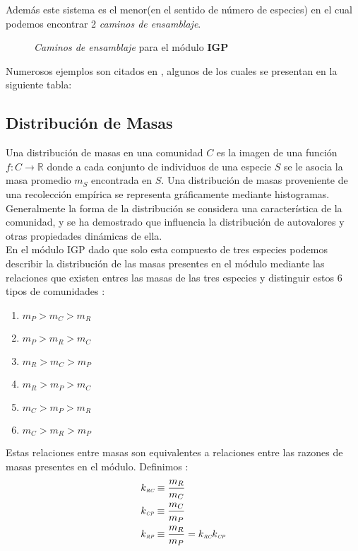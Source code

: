 Adem\'as este sistema es el menor(en el sentido de n\'umero de especies) en el cual podemos encontrar 2 \emph{caminos de ensamblaje}.
\begin{figure}[h]

\caption{\emph{Caminos de ensamblaje} para el m\'odulo \textbf{IGP}}
\label{fig:IGPAssembly}
\end{figure}
Numerosos ejemplos son citados en \cite{polis1989ecology}, algunos de los cuales se presentan en la siguiente tabla:

\subsection{Distribuci\'on de Masas}
Una distribuci\'on de masas en una comunidad $C$ es la imagen de una funci\'on  $f : C \to \mathbb{R}$ donde a cada conjunto de individuos de una especie $S$ se le asocia la masa promedio $m_S$ encontrada en $S$. Una distribuci\'on de masas proveniente de una recolecci\'on emp\'irica se representa gr\'aficamente mediante histogramas. \\
Generalmente la forma de la distribuci\'on se considera una caracter\'istica de la comunidad, y se ha demostrado que influencia la distribuci\'on de autovalores y otras propiedades din\'amicas de ella.\\

En el m\'odulo IGP dado que solo esta compuesto de tres especies podemos describir la distribuci\'on de las masas presentes en el m\'odulo mediante las relaciones que existen entres las masas de las tres especies y distinguir estos 6 tipos de comunidades :
\begin{enumerate}
  \item $m_P > m_C > m_R$
  \item $m_P > m_R > m_C$
  \item $m_R > m_C > m_P$
  \item $m_R > m_P > m_C$
  \item $m_C > m_P > m_R$
  \item $m_C > m_R > m_P$
\end{enumerate}

Estas relaciones entre masas son equivalentes a relaciones entre las razones de masas presentes en el m\'odulo. 
Definimos :
\begin{equation}\label{eq:SR}
  \begin{aligned}
    &k_{\textit{\tiny RC}} \equiv \frac{m_R}{m_C}\\
    &k_{\textit{\tiny CP}} \equiv \frac{m_C}{m_P}\\
    &k_{\textit{\tiny RP}} \equiv \frac{m_R}{m_P} = k_{\textit{\tiny RC}} k_{\textit{\tiny CP}}
  \end{aligned}
\end{equation}

